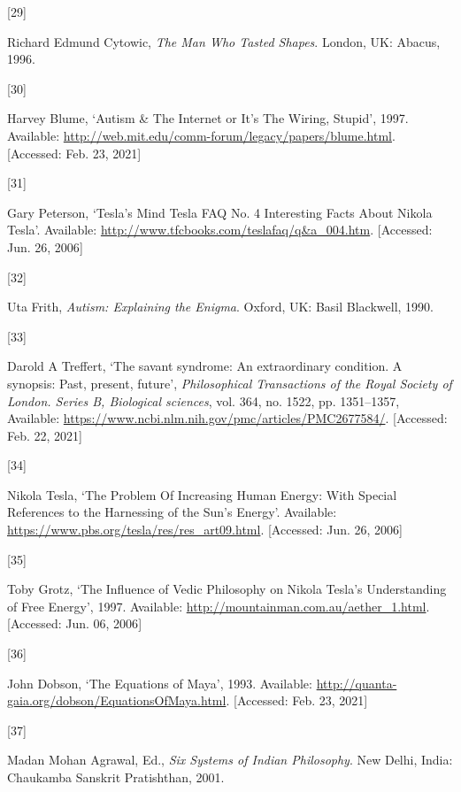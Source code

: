 \documentclass[
  a4paper,
]{article}
\newlength{\cslhangindent}
\newlength{\csllabelwidth}
\newlength{\cslentryspacingunit} %
\newenvironment{CSLReferences}[2] %
 {%
  \setlength{\parindent}{0pt}
  \ifodd #1
  \let\oldpar\par
  \def\par{\hangindent=\cslhangindent\oldpar}
  \fi
  \setlength{\parskip}{#2\cslentryspacingunit}
 }%
 {}
\newcommand{\CSLLeftMargin}[1]{\parbox[t]{\csllabelwidth}{#1}}
\newcommand{\CSLRightInline}[1]{\parbox[t]{\linewidth - \csllabelwidth}{#1}\break}
\begin{document}
\begin{CSLReferences}{0}{0}
\leavevmode{}%
\CSLLeftMargin{{[}29{]} }%
\CSLRightInline{Richard Edmund Cytowic, \emph{{The Man Who Tasted
Shapes}}. London, UK: Abacus, 1996.}

\leavevmode{}%
\CSLLeftMargin{{[}30{]} }%
\CSLRightInline{Harvey Blume, {`{Autism \& The Internet or It's The
Wiring, Stupid}'}, 1997. Available:
\url{http://web.mit.edu/comm-forum/legacy/papers/blume.html}.
{[}Accessed: Feb. 23, 2021{]}}

\leavevmode{}%
\CSLLeftMargin{{[}31{]} }%
\CSLRightInline{Gary Peterson, {`{Tesla's Mind \textbar{} Tesla FAQ No.
4 \textbar{} Interesting Facts About Nikola Tesla}'}. Available:
\url{http://www.tfcbooks.com/teslafaq/q\&a_004.htm}. {[}Accessed: Jun.
26, 2006{]}}

\leavevmode{}%
\CSLLeftMargin{{[}32{]} }%
\CSLRightInline{Uta Frith, \emph{{Autism: Explaining the Enigma}}.
Oxford, UK: Basil Blackwell, 1990.}

\leavevmode{}%
\CSLLeftMargin{{[}33{]} }%
\CSLRightInline{Darold A Treffert, {`The savant syndrome: An
extraordinary condition. A synopsis: Past, present, future'},
\emph{Philosophical Transactions of the Royal Society of London. Series
B, Biological sciences}, vol. 364, no. 1522, pp. 1351--1357, Available:
\url{https://www.ncbi.nlm.nih.gov/pmc/articles/PMC2677584/}.
{[}Accessed: Feb. 22, 2021{]}}

\leavevmode{}%
\CSLLeftMargin{{[}34{]} }%
\CSLRightInline{Nikola Tesla, {`{The Problem Of Increasing Human Energy:
With Special References to the Harnessing of the Sun's Energy}'}.
Available: \url{https://www.pbs.org/tesla/res/res_art09.html}.
{[}Accessed: Jun. 26, 2006{]}}

\leavevmode{}%
\CSLLeftMargin{{[}35{]} }%
\CSLRightInline{Toby Grotz, {`{The Influence of Vedic Philosophy on
Nikola Tesla's Understanding of Free Energy}'}, 1997. Available:
\url{http://mountainman.com.au/aether_1.html}. {[}Accessed: Jun. 06,
2006{]}}

\leavevmode{}%
\CSLLeftMargin{{[}36{]} }%
\CSLRightInline{John Dobson, {`{The Equations of Maya}'}, 1993.
Available: \url{http://quanta-gaia.org/dobson/EquationsOfMaya.html}.
{[}Accessed: Feb. 23, 2021{]}}

\leavevmode{}%
\CSLLeftMargin{{[}37{]} }%
\CSLRightInline{Madan Mohan Agrawal, Ed., \emph{{Six Systems of Indian
Philosophy}}. New Delhi, India: Chaukamba Sanskrit Pratishthan, 2001.}


\end{CSLReferences}
\end{document}
